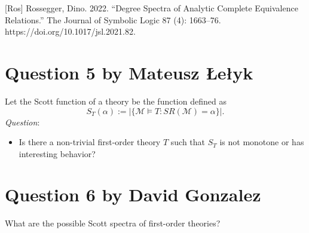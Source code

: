 \documentclass{article}
\begin{document}
 [Ros] Rossegger, Dino. 2022. “Degree Spectra of Analytic Complete Equivalence Relations.” The Journal of Symbolic Logic 87 (4): 1663–76. https://doi.org/10.1017/jsl.2021.82.


\section*{Question 5 {\small{by Mateusz \L{}e\l{}yk}}}
Let the Scott function of a theory  be the function defined as 
 \[S_T(\alpha):=|\{\mathcal{M} \models T : SR(\mathcal{M})= \alpha\}|.\] 
 \textit{Question}:
 \begin{itemize}
     \item Is there a non-trivial first-order theory $T$ such that $S_T$ is not monotone or has interesting behavior?
 \end{itemize}



\section*{Question 6 {\small{by David Gonzalez}}}
What are the possible Scott spectra of first-order theories?
\end{document}
